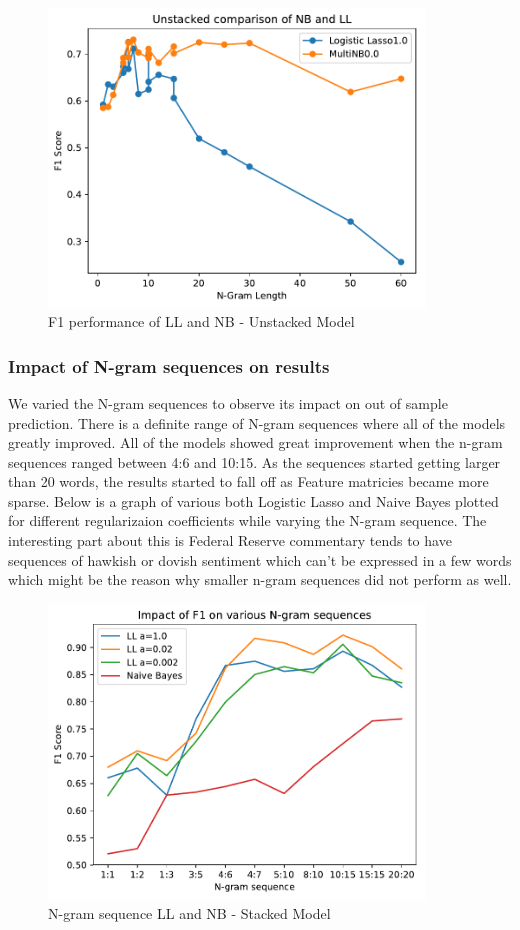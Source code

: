 \documentclass[11pt]{article}
\begin{document}
{\begin{figure}[h!]
  \centering
  \includegraphics[width=100mm]{./ngramlen_nb_ll.pdf}
  \caption{F1 performance of LL and NB - Unstacked Model}
\end{figure}

\subsubsection{Impact of N-gram sequences on results}
We varied the N-gram sequences to observe its impact on out of sample prediction.  There is a definite range of N-gram sequences where all of the models greatly improved. 
All of the models showed great improvement when the n-gram sequences ranged between 4:6 and 10:15.  As the sequences started getting larger than 20 words, the results
started to fall off as Feature matricies became more sparse.  Below is a graph of various both Logistic Lasso and Naive Bayes plotted for
different regularizaion coefficients while varying the N-gram sequence.  The interesting part about this is Federal Reserve commentary tends to have sequences
of hawkish or dovish sentiment which can't be expressed in a few words which might be the reason why smaller n-gram sequences did not perform as well.
\begin{figure}[h!]
  \centering
  \includegraphics[width=100mm]{./ngram_seq.pdf}
  \caption{N-gram sequence LL and NB - Stacked Model}
\end{figure}
\vfill

}
\end{document}
